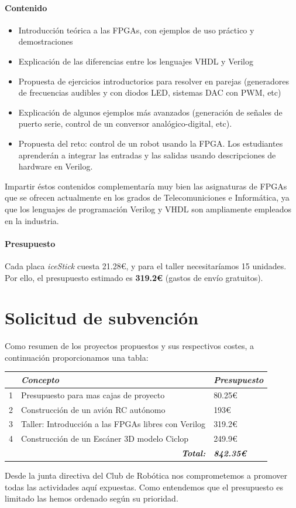 \documentclass[12pt,twoside]{report}
\begin{document}
\subsubsection{Contenido}

\begin{itemize}
	\item Introducción teórica a las FPGAs, con ejemplos de uso práctico y demostraciones
	\item Explicación de las diferencias entre los lenguajes VHDL y Verilog
	\item Propuesta de ejercicios introductorios para resolver en parejas (generadores de frecuencias audibles y con diodos LED, sistemas DAC con PWM, etc)
	\item Explicación de algunos ejemplos más avanzados (generación de señales de puerto serie, control de un conversor analógico-digital, etc).
	\item Propuesta del reto: control de un robot usando la FPGA. Los estudiantes aprenderán a integrar las entradas y las salidas usando descripciones de hardware en Verilog.
\end{itemize}

Impartir éstos contenidos complementaría muy bien las asignaturas de FPGAs que se ofrecen actualmente en los grados de Telecomuniciones e Informática, ya que los lenguajes de programación Verilog y VHDL son ampliamente empleados en la industria.


\subsubsection{Presupuesto}

Cada placa \emph{iceStick} cuesta 21.28\euro{}, y para el taller necesitaríamos 15 unidades. Por ello, el presupuesto estimado es \textbf{319.2\euro{}} (gastos de envío gratuitos).


\newpage



\chapter{Solicitud de subvención}


Como resumen de los proyectos propuestos y sus respectivos costes, a continuación proporcionamos una tabla:


\begin{tabular}{|l|l|l|}
\hline
 & \textit{\textbf{Concepto}}                          & \textit{\textbf{Presupuesto}} \\ \hline
1 & Presupuesto para mas cajas de proyecto				 & 80.25\euro{} \\ \hline
2 & Construcción de un avión RC autónomo               & 193\euro{} \\ \hline
3 & Taller: Introducción a las FPGAs libres con Verilog & 319.2\euro{} \\ \hline
4 & Construcción de un Escáner 3D modelo Ciclop        & 249.9\euro{} \\ \hline
 & \multicolumn{1}{|r|}{\textit{\textbf{Total:}}}      & \textit{\textbf{842.35\euro{}}}         \\ \hline
\end{tabular}


Desde la junta directiva del Club de Robótica nos comprometemos a promover todas las actividades aquí expuestas. Como entendemos que el presupuesto es limitado las hemos ordenado según su prioridad.
\end{document}
